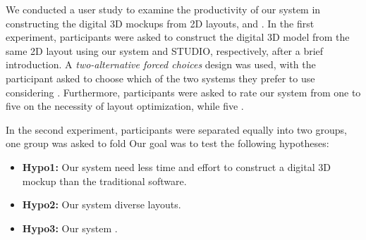  
We conducted a user study to examine the productivity of our system in constructing the digital 3D mockups from 2D layouts, and . 
%
% 
In the first experiment, participants were asked to construct the digital 3D model from the same 2D layout using our system and  STUDIO, respectively, after a brief introduction.
A \emph{two-alternative forced choices} design was used, with the participant asked to choose which of the two systems they prefer to use considering . 
%
Furthermore, participants were asked to rate our system from one to five on the necessity of layout optimization, while five . 


%
In the second experiment, participants were separated equally into two groups, one group was asked to fold 
%
Our goal was to test the following hypotheses:

\begin{itemize}
	\item \textbf{Hypo1:} Our system need less time and effort to construct a digital 3D mockup than the traditional software.
	\item \textbf{Hypo2:} Our system  diverse layouts.
	\item \textbf{Hypo3:} Our system .
\end{itemize}

